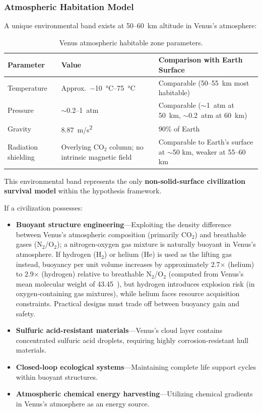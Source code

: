 \documentclass[aps,prd,twocolumn,superscriptaddress,nofootinbib]{revtex4-2}
\begin{document}
\subsubsection{Atmospheric Habitation Model}\label{sec:venus-atmo}

A unique environmental band exists at 50--60~km altitude in Venus's atmosphere:

\begin{table}[htbp]
\caption{Venus atmospheric habitable zone parameters.}
\label{tab:venus-atmo}
\begin{tabular}{lll}
\toprule
Parameter & Value & Comparison with Earth Surface \\
\midrule
Temperature & Approx.\ \SIrange{-10}{75}{\degreeCelsius} & Comparable (50--55~km most habitable) \\
Pressure & ${\sim}$0.2--\SI{1}{atm} & Comparable (${\sim}$\SI{1}{atm} at \SI{50}{km}, ${\sim}$\SI{0.2}{atm} at \SI{60}{km}) \\
Gravity & \SI{8.87}{m/s^2}~\cite{NASA_Venus_Fact} & 90\% of Earth \\
Radiation shielding & Overlying CO$_{2}$ column; no intrinsic magnetic field & Comparable to Earth's surface at ${\sim}$50 km, weaker at 55--60 km \\
\bottomrule
\end{tabular}
\end{table}

This environmental band represents the only \textbf{non-solid-surface civilization survival model} within the hypothesis framework.

If a civilization possesses:

\begin{itemize}
  \item \textbf{Buoyant structure engineering}---Exploiting the density difference between Venus's atmospheric composition (primarily CO$_{2}$) and breathable gases (N$_{2}$/O$_{2}$); a nitrogen-oxygen gas mixture is naturally buoyant in Venus's atmosphere. If hydrogen (H$_{2}$) or helium (He) is used as the lifting gas instead, buoyancy per unit volume increases by approximately 2.7$\times$ (helium) to 2.9$\times$ (hydrogen) relative to breathable N$_{2}$/O$_{2}$ (computed from Venus's mean molecular weight of 43.45~\cite{NASA_Venus_Fact}), but hydrogen introduces explosion risk (in oxygen-containing gas mixtures), while helium faces resource acquisition constraints. Practical designs must trade off between buoyancy gain and safety.
  \item \textbf{Sulfuric acid-resistant materials}---Venus's cloud layer contains concentrated sulfuric acid droplets, requiring highly corrosion-resistant hull materials.
  \item \textbf{Closed-loop ecological systems}---Maintaining complete life support cycles within buoyant structures.
  \item \textbf{Atmospheric chemical energy harvesting}---Utilizing chemical gradients in Venus's atmosphere as an energy source.
\end{itemize}
\end{document}
